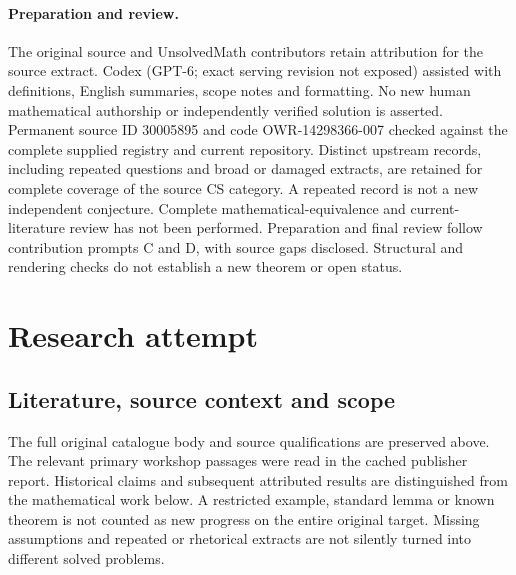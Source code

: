\documentclass[11pt]{article}
\begin{document}
\paragraph{Preparation and review.}
The original source and UnsolvedMath contributors retain attribution for the source extract. Codex (GPT-6; exact serving revision not exposed) assisted with definitions, English summaries, scope notes and formatting. No new human mathematical authorship or independently verified solution is asserted. Permanent source ID 30005895 and code OWR-14298366-007 checked against the complete supplied registry and current repository. Distinct upstream records, including repeated questions and broad or damaged extracts, are retained for complete coverage of the source CS category. A repeated record is not a new independent conjecture. Complete mathematical-equivalence and current-literature review has not been performed. Preparation and final review follow contribution prompts C and D, with source gaps disclosed. Structural and rendering checks do not establish a new theorem or open status.
\label{end:30005895}

\section{Research attempt}
\subsection{Literature, source context and scope}
The full original catalogue body and source qualifications are preserved above. The relevant primary workshop passages were read in the cached publisher report. Historical claims and subsequent attributed results are distinguished from the mathematical work below. A restricted example, standard lemma or known theorem is not counted as new progress on the entire original target. Missing assumptions and repeated or rhetorical extracts are not silently turned into different solved problems.
\end{document}
